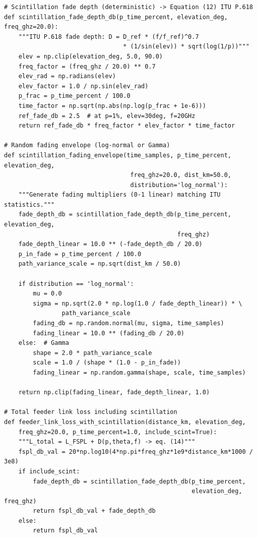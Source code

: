 \begin{lstlisting}[caption={Scintillation fading model (ITU P.618)},label={lst:scint}]
# Scintillation fade depth (deterministic) -> Equation (12) ITU P.618
def scintillation_fade_depth_db(p_time_percent, elevation_deg, freq_ghz=20.0):
    """ITU P.618 fade depth: D = D_ref * (f/f_ref)^0.7
                                 * (1/sin(elev)) * sqrt(log(1/p))"""
    elev = np.clip(elevation_deg, 5.0, 90.0)
    freq_factor = (freq_ghz / 20.0) ** 0.7
    elev_rad = np.radians(elev)
    elev_factor = 1.0 / np.sin(elev_rad)
    p_frac = p_time_percent / 100.0
    time_factor = np.sqrt(np.abs(np.log(p_frac + 1e-6)))
    ref_fade_db = 2.5  # at p=1%, elev=30deg, f=20GHz
    return ref_fade_db * freq_factor * elev_factor * time_factor

# Random fading envelope (log-normal or Gamma)
def scintillation_fading_envelope(time_samples, p_time_percent, elevation_deg,
                                   freq_ghz=20.0, dist_km=50.0,
                                   distribution='log_normal'):
    """Generate fading multipliers (0-1 linear) matching ITU statistics."""
    fade_depth_db = scintillation_fade_depth_db(p_time_percent, elevation_deg,
                                                freq_ghz)
    fade_depth_linear = 10.0 ** (-fade_depth_db / 20.0)
    p_in_fade = p_time_percent / 100.0
    path_variance_scale = np.sqrt(dist_km / 50.0)

    if distribution == 'log_normal':
        mu = 0.0
        sigma = np.sqrt(2.0 * np.log(1.0 / fade_depth_linear)) * \
                path_variance_scale
        fading_db = np.random.normal(mu, sigma, time_samples)
        fading_linear = 10.0 ** (fading_db / 20.0)
    else:  # Gamma
        shape = 2.0 * path_variance_scale
        scale = 1.0 / (shape * (1.0 - p_in_fade))
        fading_linear = np.random.gamma(shape, scale, time_samples)

    return np.clip(fading_linear, fade_depth_linear, 1.0)

# Total feeder link loss including scintillation
def feeder_link_loss_with_scintillation(distance_km, elevation_deg,
    freq_ghz=20.0, p_time_percent=1.0, include_scint=True):
    """L_total = L_FSPL + D(p,theta,f) -> eq. (14)"""
    fspl_db_val = 20*np.log10(4*np.pi*freq_ghz*1e9*distance_km*1000 / 3e8)
    if include_scint:
        fade_depth_db = scintillation_fade_depth_db(p_time_percent,
                                                    elevation_deg, freq_ghz)
        return fspl_db_val + fade_depth_db
    else:
        return fspl_db_val
\end{lstlisting}

